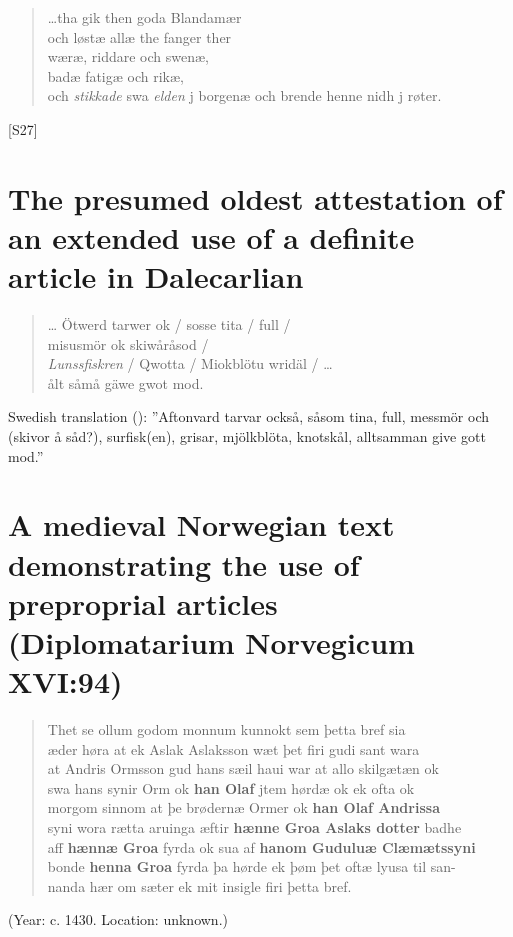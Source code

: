 \begin{quotation}

 
…tha gik then goda Blandamær\\
och løstæ allæ the fanger ther\\
wæræ, riddare och swenæ,\\
badæ fatigæ och rikæ,\\
och \textit{stikkade} swa \textit{elden} j borgenæ och brende henne nidh j røter.

\end{quotation}
[S27]

\section{The presumed oldest attestation of an extended use of a definite article in Dalecarlian}

\begin{quotation} 
… Ötwerd tarwer ok / sosse tita / full /\\
misusmör ok skiwåråsod / \\
\textit{Lunssfiskren} / Qwotta / Miokblötu wridäl / …\\
ålt såmå gäwe gwot mod.%
\\
\end{quotation}
 

Swedish translation (\citealt[166]{Björklund1994}): ”Aftonvard tarvar också, såsom tina, full, messmör och (skivor å såd?), surfisk(en), grisar, mjölkblöta, knotskål, alltsamman give gott mod.”

\section{A medieval Norwegian text demonstrating the use of preproprial articles (Diplomatarium Norvegicum XVI:94)}

\begin{quotation} 

Thet se ollum godom monnum kunnokt sem þetta bref sia\\
æder høra at ek Aslak Aslaksson wæt þet firi gudi sant wara\\
at Andris Ormsson gud hans sæil haui war at allo skilgætæn ok\\
swa hans synir Orm ok \textbf{han Olaf} jtem hørdæ ok ek ofta ok\\
morgom sinnom at þe brødernæ Ormer ok \textbf{han Olaf Andrissa}\\
syni wora rætta aruinga æftir \textbf{hænne Groa Aslaks dotter} badhe\\
aff \textbf{hænnæ Groa} fyrda ok sua af \textbf{hanom Guduluæ Clæmætssyni}\\
bonde \textbf{henna Groa} fyrda þa hørde ek þøm þet oftæ lyusa til san-\\
nanda hær om sæter ek mit insigle firi þetta bref.
\end{quotation}

 (Year: c. 1430. Location: unknown.)
